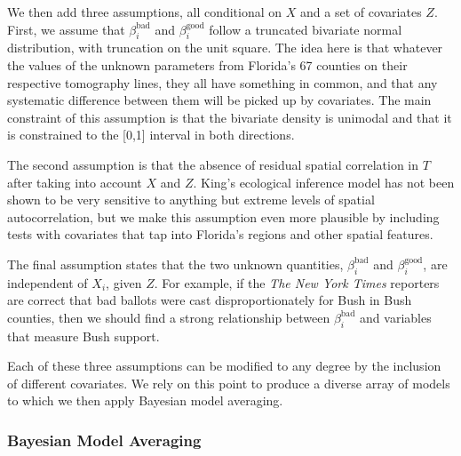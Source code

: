 \documentclass[11pt,titlepage]{article}
\newcommand{\bb}{\beta^{\text{bad}}}
\newcommand{\bg}{\beta^{\text{good}}}
\begin{document}

We then add three assumptions, all conditional on $X$ and a set of
covariates $Z$.  First, we assume that $\bb_i$ and $\bg_i$ follow a
truncated bivariate normal distribution, with truncation on the unit
square.  The idea here is that whatever the values of the unknown
parameters from Florida's 67 counties on their respective tomography
lines, they all have something in common, and that any systematic
difference between them will be picked up by covariates.  The main
constraint of this assumption is that the bivariate density is
unimodal and that it is constrained to the [0,1] interval in both
directions.

The second assumption is that the absence of residual spatial
correlation in $T$ after taking into account $X$ and $Z$.  King's
ecological inference model has not been shown to be very sensitive to
anything but extreme levels of spatial autocorrelation, but we make
this assumption even more plausible by including tests with covariates
that tap into Florida's regions and other spatial features.

The final assumption states that the two unknown quantities, $\bb_i$
and $\bg_i$, are independent of $X_i$, given $Z$.  For example, if the
\textit{The New York Times} reporters are correct that bad ballots
were cast disproportionately for Bush in Bush counties, then we should
find a strong relationship between $\bb_i$ and variables that measure
Bush support.

Each of these three assumptions can be modified to any degree by the
inclusion of different covariates.  We rely on this point to produce a
diverse array of models to which we then apply Bayesian model
averaging.

\subsubsection{Bayesian Model Averaging}
\end{document}
